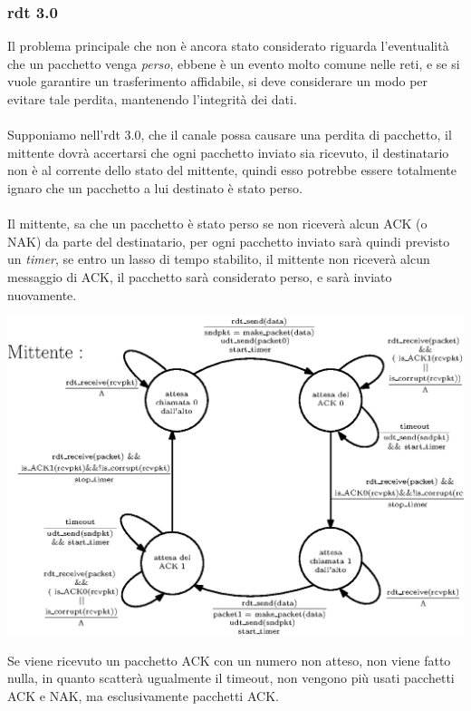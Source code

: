 \documentclass[12pt, letterpaper]{article}
\newcommand{\acc}{\\\hphantom{}\\}
\begin{document}
\subsubsection{rdt 3.0}
Il problema principale che non è ancora stato considerato riguarda l'eventualità che un pacchetto venga 
\textit{perso}, ebbene è un evento molto comune nelle reti, e se si vuole garantire un trasferimento affidabile, 
si deve considerare un modo per evitare tale perdita, mantenendo l'integrità dei dati.\acc 
Supponiamo nell'rdt 3.0, che il canale possa causare una perdita di pacchetto, il mittente dovrà accertarsi che ogni pacchetto 
inviato sia ricevuto, il destinatario non è al corrente dello stato del mittente, quindi esso potrebbe essere totalmente 
ignaro che un pacchetto a lui destinato è stato perso.\acc 
Il mittente, sa che un pacchetto è stato perso se non riceverà alcun ACK (o NAK) da parte del destinatario, per ogni pacchetto 
inviato sarà quindi previsto un \textit{timer}, se entro un lasso di tempo stabilito, il mittente non riceverà alcun messaggio 
di ACK, il pacchetto sarà considerato perso, e sarà inviato nuovamente.\begin{center}
    \includegraphics[width=1\textwidth ]{images/rdt3.0.eps}
\end{center} 
Se viene ricevuto un pacchetto ACK con un numero non atteso, non viene fatto nulla, in quanto scatterà ugualmente 
il timeout, non vengono più usati pacchetti ACK e NAK, ma esclusivamente pacchetti ACK. 
\end{document}
